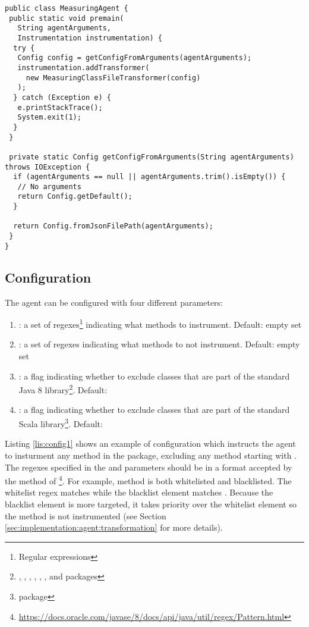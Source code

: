 \begin{lstlisting}[breaklines,caption={$MeasuringAgent$ class},label=lis:measuringagent]
public class MeasuringAgent {
 public static void premain(
   String agentArguments,
   Instrumentation instrumentation) {
  try {
   Config config = getConfigFromArguments(agentArguments);
   instrumentation.addTransformer(
     new MeasuringClassFileTransformer(config)
   );
  } catch (Exception e) {
   e.printStackTrace();
   System.exit(1);
  }
 }

 private static Config getConfigFromArguments(String agentArguments) throws IOException {
  if (agentArguments == null || agentArguments.trim().isEmpty()) {
   // No arguments
   return Config.getDefault();
  }

  return Config.fromJsonFilePath(agentArguments);
 }
}
\end{lstlisting}

\subsection{Configuration}
\label{sec:implementation:agent:configuration}
The agent can be configured with four different parameters:
\begin{enumerate}
  \item \textbf{}: a set of regexes\footnote{Regular expressions} indicating what methods to instrument. Default: empty set
  \item \textbf{}: a set of regexes indicating what methods to not instrument. Default: empty set
  \item \textbf{}: a flag indicating whether to exclude classes that are part of the standard Java 8 library\footnote{, , , , , ,  and  packages}. Default: 
  \item \textbf{}:  a flag indicating whether to exclude classes that are part of the standard Scala library\footnote{ package}. Default: 
\end{enumerate}

\noindent Listing \ref{lis:config1} shows an example of configuration which instructs the agent to insturment any method in the  package, excluding any method starting with . The regexes specified in the  and  parameters should be in a format accepted by the  method of \footnote{\url{https://docs.oracle.com/javase/8/docs/api/java/util/regex/Pattern.html}}. For example, method  is both whitelisted and blacklisted. The whitelist regex matches  while the blacklist element matches . Because the blacklist element is more targeted, it takes priority over the whitelist element so the method is not instrumented (see Section \ref{sec:implementation:agent:transformation} for more details).

